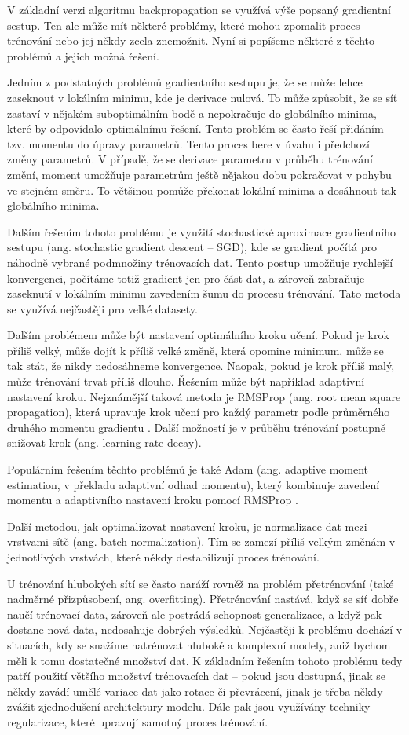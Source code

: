 V základní verzi algoritmu backpropagation se využívá výše popsaný gradientní
sestup. Ten ale může mít některé problémy, které mohou zpomalit proces
trénování nebo jej někdy zcela znemožnit. Nyní si popíšeme některé z těchto
problémů a jejich možná řešení.

Jedním z podstatných problémů gradientního sestupu je, že se může lehce
zaseknout v lokálním minimu, kde je derivace nulová. To může způsobit, že se
síť zastaví v nějakém suboptimálním bodě a nepokračuje do globálního minima,
které by odpovídalo optimálnímu řešení. Tento problém se často řeší přidáním
tzv. momentu do úpravy parametrů. Tento proces bere v úvahu i předchozí změny
parametrů. V případě, že se derivace parametru v průběhu trénování změní,
moment umožňuje parametrům ještě nějakou dobu pokračovat v pohybu ve stejném
směru. To většinou pomůže překonat lokální minima a dosáhnout tak globálního
minima.

Dalším řešením tohoto problému je využití stochastické aproximace gradientního
sestupu (ang. stochastic gradient descent – SGD), kde se gradient počítá pro
náhodně vybrané podmnožiny trénovacích dat. Tento postup umožňuje rychlejší
konvergenci, počítáme totiž gradient jen pro část dat, a zároveň zabraňuje
zaseknutí v lokálním minimu zavedením šumu do procesu trénování. Tato metoda se
využívá nejčastěji pro velké datasety.

Dalším problémem může být nastavení optimálního kroku učení. Pokud je krok
příliš velký, může dojít k příliš velké změně, která opomine minimum, může se tak stát, že nikdy nedosáhneme konvergence. Naopak, pokud je krok příliš malý, může
trénování trvat příliš dlouho. Řešením může být například adaptivní nastavení
kroku. Nejznámější taková metoda je RMSProp (ang. root mean square
propagation), která upravuje krok učení pro každý parametr podle průměrného
druhého momentu gradientu \cite{RMSProp}. Další možností je v průběhu trénování
postupně snižovat krok (ang. learning rate decay).

Populárním řešením těchto problémů je také Adam (ang. adaptive moment
estimation, v překladu adaptivní odhad momentu), který kombinuje zavedení
momentu a adaptivního nastavení kroku pomocí RMSProp \cite{adam}.

Další metodou, jak optimalizovat nastavení kroku, je normalizace dat mezi
vrstvami sítě (ang. batch normalization). Tím se zamezí příliš velkým změnám v
jednotlivých vrstvách, které někdy destabilizují proces trénování.

U trénování hlubokých sítí se často naráží rovněž na problém přetrénování (také
nadměrné přizpůsobení, ang. overfitting). Přetrénování nastává, když se síť
dobře naučí trénovací data, zároveň ale postrádá schopnost generalizace, a když
pak dostane nová data, nedosahuje dobrých výsledků. Nejčastěji k problému
dochází v situacích, kdy se snažíme natrénovat hluboké a komplexní modely, aniž
bychom měli k tomu dostatečné množství dat. K základním řešením tohoto problému
tedy patří použití většího množství trénovacích dat – pokud jsou dostupná,
jinak se někdy zavádí umělé variace dat jako rotace či převrácení, jinak je
třeba někdy zvážit zjednodušení architektury modelu. Dále pak jsou využívány
techniky regularizace, které upravují samotný proces trénování.

